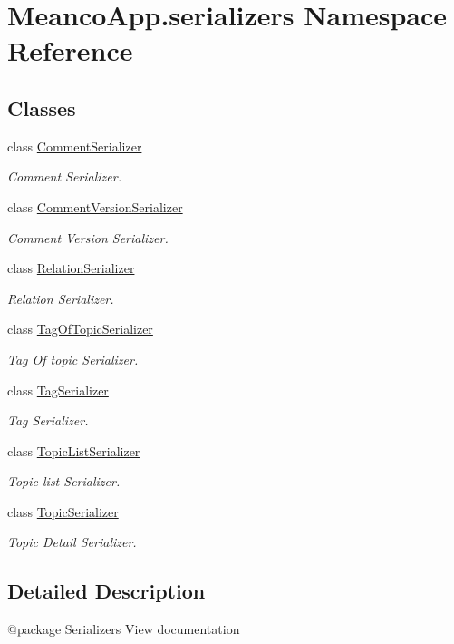 \hypertarget{namespace_meanco_app_1_1serializers}{}\section{Meanco\+App.\+serializers Namespace Reference}
\label{namespace_meanco_app_1_1serializers}
\subsection*{Classes}
\begin{DoxyCompactItemize}
\item 
class \hyperlink{class_meanco_app_1_1serializers_1_1_comment_serializer}{Comment\+Serializer}
\begin{DoxyCompactList}\small\item\em Comment Serializer. \end{DoxyCompactList}\item 
class \hyperlink{class_meanco_app_1_1serializers_1_1_comment_version_serializer}{Comment\+Version\+Serializer}
\begin{DoxyCompactList}\small\item\em Comment Version Serializer. \end{DoxyCompactList}\item 
class \hyperlink{class_meanco_app_1_1serializers_1_1_relation_serializer}{Relation\+Serializer}
\begin{DoxyCompactList}\small\item\em Relation Serializer. \end{DoxyCompactList}\item 
class \hyperlink{class_meanco_app_1_1serializers_1_1_tag_of_topic_serializer}{Tag\+Of\+Topic\+Serializer}
\begin{DoxyCompactList}\small\item\em Tag Of topic Serializer. \end{DoxyCompactList}\item 
class \hyperlink{class_meanco_app_1_1serializers_1_1_tag_serializer}{Tag\+Serializer}
\begin{DoxyCompactList}\small\item\em Tag Serializer. \end{DoxyCompactList}\item 
class \hyperlink{class_meanco_app_1_1serializers_1_1_topic_list_serializer}{Topic\+List\+Serializer}
\begin{DoxyCompactList}\small\item\em Topic list Serializer. \end{DoxyCompactList}\item 
class \hyperlink{class_meanco_app_1_1serializers_1_1_topic_serializer}{Topic\+Serializer}
\begin{DoxyCompactList}\small\item\em Topic Detail Serializer. \end{DoxyCompactList}\end{DoxyCompactItemize}


\subsection{Detailed Description}
\begin{DoxyVerb}@package Serializers
View documentation\end{DoxyVerb}
 